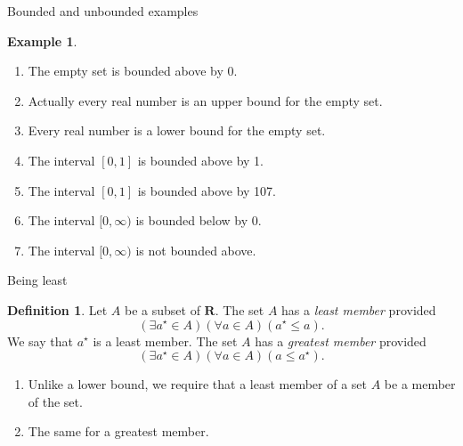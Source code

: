 \documentclass[fleqn]{beamer}
\newcommand{\reals}{\mathbf{R}}
\theoremstyle{definition}
\newtheorem{mydef}{Definition}
\newtheorem{myex}{Example}
\newenvironment{numberlist}
   {\begin{enumerate}[(1)]
       \addtolength{\itemsep}{-0.5\itemsep}}
     {\end{enumerate}}
\begin{document}
\begin{frame}{Bounded and unbounded examples}

\begin{myex}
  \begin{numberlist}
    \item The empty set is bounded above by 0.
    \vspace{0.15in}
      \item Actually every real number is an upper bound for the empty set.
      \vspace{0.15in}
      \item Every real number is a lower bound for the empty set.
      \vspace{0.15in}
   \item The interval \([0,1] \) is bounded above by 1.
   \vspace{0.15in}
   \item The interval \([0,1] \) is bounded above by 107.
   \vspace{0.15in}
   \item The interval \([0,\infty) \) is bounded below by 0.
   \vspace{0.15in}
   \item The interval \([0,\infty) \) is not bounded above.
\end{numberlist}
\end{myex}

\end{frame}




\begin{frame}{Being least}
\begin{mydef} Let \(A\) be a subset of \(\reals\). The set \(A\) has a \emph{least member} provided
  \[
     \left(\exists a^\star \in A \right) \left( \forall a \in A \right)
     (a^\star \leq a).
  \]
  We say that \(a^\star\) is a least member.  The set \(A\) has a \emph{greatest
  member} provided
  \[
     \left(\exists a^\star \in A \right) \left( \forall a \in A \right)
     (a \leq a^\star).
  \]
  \end{mydef}


\begin{numberlist}
 \item Unlike a lower bound, we require that a least member of a set \(A\) be a member of the set.

 \vspace{0.15in}

 \item The same for a greatest member.
\end{numberlist}

\end{frame}
\end{document}

